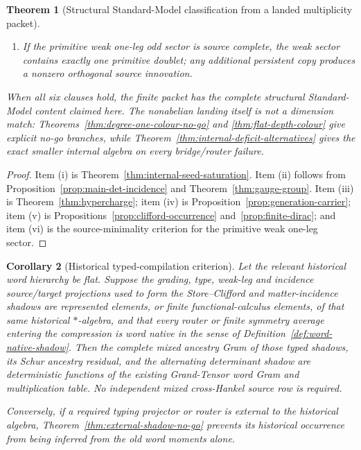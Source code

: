 \documentclass[11pt]{article}
\newtheorem{theorem}{Theorem}[section]
\newtheorem{corollary}[theorem]{Corollary}
\theoremstyle{definition}
\theoremstyle{remark}
\begin{document}
\begin{theorem}[Structural Standard-Model classification from a landed multiplicity packet]
\begin{enumerate}[label=\textup{(\roman*)},leftmargin=2.8em]
      source-saturated full-cell generator is odd-provenance complete, its odd
      part is one source-minimal finite Dirac operator $D_F$; the
      Yukawa/Majorana residue matrices are typed contractions of that operator
      in one common generation frame.
\item If the primitive weak one-leg odd sector is source complete, the weak
      sector contains exactly one primitive doublet; any additional persistent
      copy produces a nonzero orthogonal source innovation.
\end{enumerate}
When all six clauses hold, the finite packet has the complete structural
Standard-Model content claimed here.  The nonabelian landing itself is not a
dimension match: Theorems~\ref{thm:degree-one-colour-no-go} and
\ref{thm:flat-depth-colour} give explicit no-go branches, while
Theorem~\ref{thm:internal-deficit-alternatives} gives the exact smaller
internal algebra on every bridge/router failure.
\end{theorem}

\begin{proof}
Item (i) is Theorem~\ref{thm:internal-seed-saturation}.  Item (ii) follows
from Proposition~\ref{prop:main-det-incidence} and
Theorem~\ref{thm:gauge-group}.  Item (iii) is
Theorem~\ref{thm:hypercharge}; item (iv) is
Proposition~\ref{prop:generation-carrier}; item (v) is
Propositions~\ref{prop:clifford-occurrence} and~\ref{prop:finite-dirac}; and
item (vi) is the source-minimality criterion for the primitive weak one-leg
sector.
\end{proof}

\begin{corollary}[Historical typed-compilation criterion]
\label{cor:historical-typed-compilation}
Let the relevant historical word hierarchy be flat.  Suppose the grading,
type, weak-leg and incidence source/target projections used to form the
Store--Clifford and matter-incidence shadows are represented elements, or
finite functional-calculus elements, of that same historical $*$-algebra, and
that every router or finite symmetry average entering the compression is
word native in the sense of Definition~\ref{def:word-native-shadow}.  Then the
complete mixed ancestry Gram of those typed shadows, its Schur ancestry
residual, and the alternating determinant shadow are deterministic functions
of the existing Grand-Tensor word Gram and multiplication table.  No
independent mixed cross-Hankel source row is required.

Conversely, if a required typing projector or router is external to the
historical algebra, Theorem~\ref{thm:external-shadow-no-go} prevents its
historical occurrence from being inferred from the old word moments alone.
\end{corollary}
\end{document}
